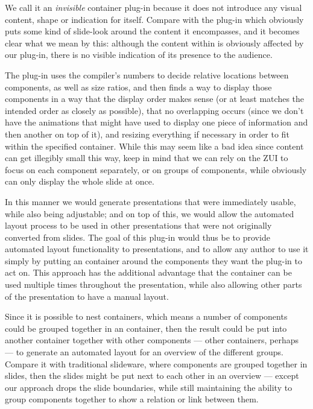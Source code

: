     We call it an \emph{invisible} container plug-in because it does not
    introduce any visual content, shape or indication for itself. Compare with
    the  plug-in which obviously puts some kind of slide-look
    around the content it encompasses, and it becomes clear what we mean by
    this: although the content within is obviously affected by our plug-in,
    there is no visible indication of its presence to the audience.

    The plug-in uses the compiler's numbers to decide relative locations
    between components, as well as size ratios, and then finds a way to display
    those components in a way that the display order makes sense (or at least
    matches the intended order as closely as possible), that no overlapping
    occurs (since we don't have the animations that \ppt might have used to
    display one piece of information and then another on top of it), and
    resizing everything if necessary in order to fit within the specified
    container. While this may seem like a bad idea since content can get
    illegibly small this way, keep in mind that we can rely on the ZUI to focus
    on each component separately, or on groups of components, while \ppt
    obviously can only display the whole slide at once.

    In this manner we would generate \mxp presentations that were immediately
    usable, while also being adjustable; and on top of this, we would allow the
    automated layout process to be used in other \mxp presentations that were
    not originally converted from \ppt slides. The goal of this plug-in would
    thus be to provide automated layout functionality to \mxp presentations,
    and to allow any \mxp author to use it simply by putting an
     container around the components they want
    the plug-in to act on. This approach has the additional advantage that the
    container can be used multiple times throughout the presentation, while
    also allowing other parts of the presentation to have a manual layout.
  
    Since it is possible to nest containers, which means a number of components
    could be grouped together in an  container, then the
    result could be put into another  container together with
    other components --- other  containers, perhaps --- to
    generate an automated layout for an overview of the different groups.
    Compare it with traditional slideware, where components are grouped
    together in slides, then the slides might be put next to each other in an
    overview --- except our approach drops the slide boundaries, while still
    maintaining the ability to group components together to show a relation or
    link between them.


